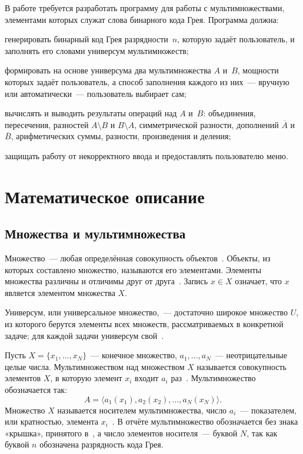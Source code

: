 \documentclass[14pt,a4paper]{extarticle}
\begin{document}
В работе требуется разработать программу для работы с мультимножествами, элементами которых служат слова бинарного кода Грея. Программа должна:
\begin{dashlist}
\item генерировать бинарный код Грея разрядности~$n$, которую задаёт пользователь, и заполнять его словами универсум мультимножеств;
\item формировать на основе универсума два мультимножества $A$ и~$B$, мощности которых задаёт пользователь, а способ заполнения каждого из них~--- вручную или автоматически~--- пользователь выбирает сам;
\item вычислять и выводить результаты операций над $A$ и~$B$: объединения, пересечения, разностей $A \setminus B$ и $B \setminus A$, симметрической разности, дополнений $\overline{A}$ и $\overline{B}$, арифметических суммы, разности, произведения и деления;
\item защищать работу от некорректного ввода и предоставлять пользователю меню.
\end{dashlist}

\section{Математическое описание}

\subsection{Множества и мультимножества}

Множество~--- любая определённая совокупность объектов~\cite{novikov}. Объекты, из которых составлено множество, называются его элементами. Элементы множества различны и отличимы друг от друга~\cite{novikov}. Запись $x \in X$ означает, что $x$ является элементом множества $X$.

Универсум, или универсальное множество,~--- достаточно широкое множество $U$, из которого берутся элементы всех множеств, рассматриваемых в конкретной задаче; для каждой задачи универсум свой~\cite{novikov}.

Пусть $X = \{x_1, \ldots, x_N\}$~--- конечное множество, $a_1, \ldots, a_N$~--- неотрицательные целые числа. Мультимножеством над множеством $X$ называется совокупность элементов $X$, в которую элемент $x_i$ входит $a_i$ раз~\cite{novikov}. Мультимножество обозначается так:
\begin{equation}\label{eq:mset}
A = \langle a_1(x_1), a_2(x_2), \ldots, a_N(x_N) \rangle .
\end{equation}
Множество $X$ называется носителем мультимножества, число $a_i$~--- показателем, или кратностью, элемента $x_i$~\cite{novikov, vostrov}. В отчёте мультимножество обозначается без знака «крышка», принятого в~\cite{novikov}, а число элементов носителя~--- буквой $N$, так как буквой $n$ обозначена разрядность кода Грея.
\end{document}
